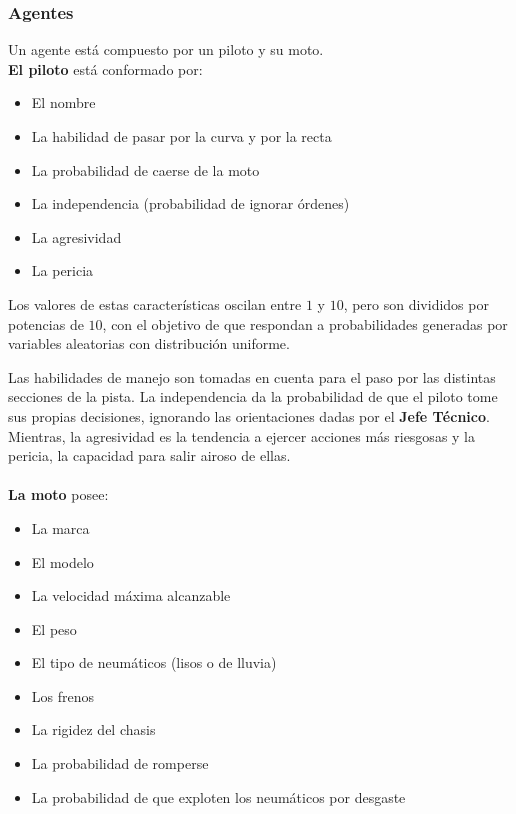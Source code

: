 \documentclass[12pt, letterpaper,spanish]{article}
\theoremstyle{definition}
\theoremstyle{remark}
\begin{document}
		

		\subsubsection{Agentes}
		Un agente está compuesto por un piloto y su moto. \\

		\textbf{El piloto} está conformado por:
		\begin{itemize}
    		\item El nombre
    		\item La habilidad de pasar por la curva y por la recta
    		\item La probabilidad de caerse de la moto
    		\item La independencia (probabilidad de ignorar órdenes)
    		\item La agresividad
    		\item La pericia
		\end{itemize}

		Los valores de estas características oscilan entre $1$ y $10$, pero son divididos por potencias de $10$, con el objetivo de que respondan a probabilidades generadas por variables aleatorias con distribución uniforme. 
		
		Las habilidades de manejo son tomadas en cuenta para el paso por las distintas secciones de la pista. La independencia da la probabilidad de que el piloto tome sus propias decisiones, ignorando las orientaciones dadas por el \textbf{Jefe Técnico}. Mientras, la agresividad es la tendencia a ejercer acciones más riesgosas y la pericia, la capacidad para salir airoso de ellas. \\ \\

		\textbf{La moto} posee:
		\begin{itemize}
    		\item La marca
    		\item El modelo
    		\item La velocidad máxima alcanzable
    		\item El peso
    		\item El tipo de neumáticos (lisos o de lluvia)
    		\item Los frenos
    		\item La rigidez del chasis
    		\item La probabilidad de romperse
    		\item La probabilidad de que exploten los neumáticos por desgaste
		\end{itemize}
\end{document}
